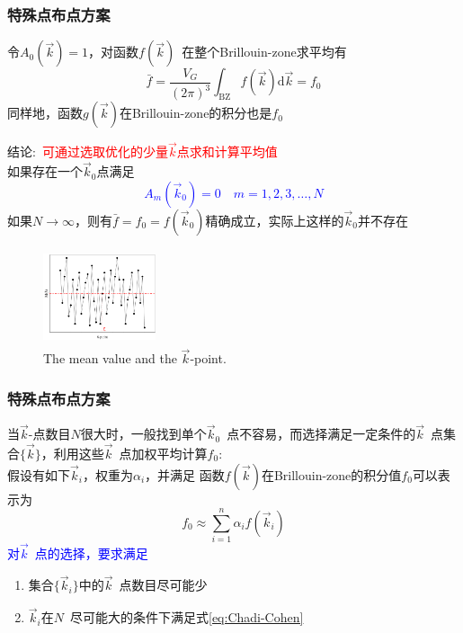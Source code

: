 {\frame
{
	\frametitle{特殊点布点方案}
	令$A_0(\vec k)=1$，对函数$f(\vec k)$~在整个\textrm{Brillouin-zone}求平均有
	$$\bar f=\dfrac{V_G}{(2\pi)^3}\int_{\mathrm{BZ}}f(\vec k)\mathrm{d}\vec k=f_0$$
	同样地，函数$g(\vec k)$在\textrm{Brillouin-zone}的积分也是$f_0$

	结论:~\textcolor{red}{可通过选取优化的少量$\vec k$点求和计算平均值}\\如果存在一个$\vec k_0$点满足\textcolor{blue}{
	$$A_m(\vec k_0)=0\quad m=1,2,3,\dots,N$$}
	如果$N\rightarrow\infty$，则有$\bar f=f_0=f(\vec k_0)$精确成立，实际上这样的$\vec k_0$并不存在
\begin{figure}[h!]
\centering
\vspace*{-0.2in}
\includegraphics[height=1.1in,width=1.3in,viewport=5 0 960 750,clip]{Figures/Brillouin-k.png}
\caption{\tiny \textrm{The mean value and the $\vec k$-point.}}%
\label{Brillouin-k}
\end{figure} 
}

\frame
{
	\frametitle{特殊点布点方案}
	当$\vec k$-点数目$N$很大时，一般找到单个$\vec k_0$~点不容易，而选择满足一定条件的$\vec k$~点集合$\{\vec k\}$，利用这些$\vec k$~点加权平均计算$f_0$:\\
	假设有如下$\vec k_i$，权重为$\alpha_i$，并满足
	{\fontsize{9.0pt}{3.9pt}}
	函数$f(\vec k)$在\textrm{Brillouin-zone}的积分值$f_0$可以表示为$$f_0\approx\sum_{i=1}^n\alpha_if(\vec k_i)$$
	\textcolor{blue}{对$\vec k$~点的选择，要求满足}
	\begin{enumerate}
		\item 集合$\{\vec k_i\}$中的$\vec k$~点数目尽可能少
		\item $\vec k_i$在$N$~尽可能大的条件下满足式\eqref{eq:Chadi-Cohen}
	\end{enumerate}
}

}
